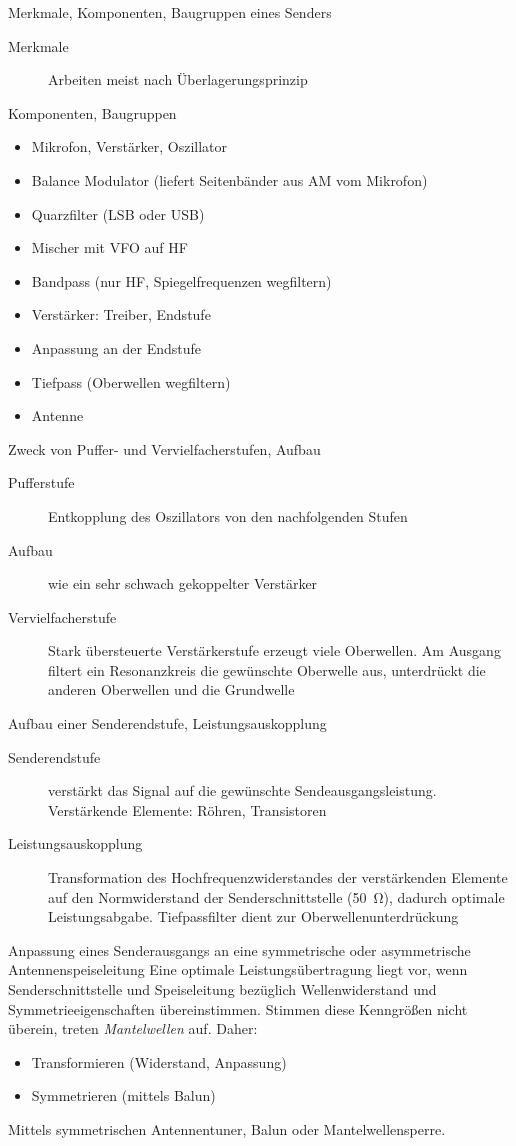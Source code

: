 \documentclass[avery5371,grid,frame,a4paper]{flashcards}
\newcommand{\card}[3]{
  \begin{flashcard}[{\chap} -- #1]{#2}#3\end{flashcard}
}
\begin{document}
\card{57}{Merkmale, Komponenten, Baugruppen eines Senders}{
  \small
  \begin{description}
    \item[Merkmale]
      Arbeiten meist nach Überlagerungsprinzip
    \item[Komponenten, Baugruppen]
  \end{description}
  \scriptsize
  \begin{itemize}
    \item Mikrofon, Verstärker, Oszillator
    \item Balance Modulator (liefert Seitenbänder aus AM vom Mikrofon)
    \item Quarzfilter (LSB oder USB)
    \item Mischer mit VFO auf HF
    \item Bandpass (nur HF, Spiegelfrequenzen wegfiltern)
    \item Verstärker: Treiber, Endstufe
    \item Anpassung an der Endstufe
    \item Tiefpass (Oberwellen wegfiltern)
    \item Antenne
  \end{itemize}
}
\card{58}{Zweck von Puffer- und Vervielfacherstufen, Aufbau}{
  \begin{description}
    \item[Pufferstufe] Entkopplung des Oszillators von den nachfolgenden Stufen
    \item[Aufbau] wie ein sehr schwach gekoppelter Verstärker
    \item[Vervielfacherstufe]
      Stark übersteuerte Verstärkerstufe erzeugt viele Oberwellen.
      Am Ausgang filtert ein Resonanzkreis die gewünschte Oberwelle aus,
      unterdrückt die anderen Oberwellen und die Grundwelle
  \end{description}
}
\card{59}{Aufbau einer Senderendstufe, Leistungsauskopplung}{
  \begin{description}
    \item[Senderendstufe]
      verstärkt das Signal auf die gewünschte Sendeausgangsleistung.
      Verstärkende Elemente: Röhren, Transistoren
    \item[Leistungsauskopplung]
      Transformation des Hochfrequenzwiderstandes der verstärkenden Elemente auf den Normwiderstand der Senderschnittstelle (\SI{50}{\ohm}), dadurch optimale Leistungsabgabe.
      Tiefpassfilter dient zur Oberwellenunterdrückung
  \end{description}
}
\card{60}{Anpassung eines Senderausgangs an eine symmetrische oder asymmetrische Antennenspeiseleitung}{
  Eine optimale Leistungsübertragung liegt vor,
  wenn Senderschnittstelle und Speiseleitung bezüglich Wellenwiderstand und Symmetrieeigenschaften übereinstimmen.
  Stimmen diese Kenngrößen nicht überein, treten \emph{Mantelwellen} auf. Daher:
  \begin{itemize}
    \item Transformieren (Widerstand, Anpassung)
    \item Symmetrieren (mittels Balun)
  \end{itemize}
  Mittels symmetrischen Antennentuner, Balun oder Mantelwellensperre.
}
\end{document}
